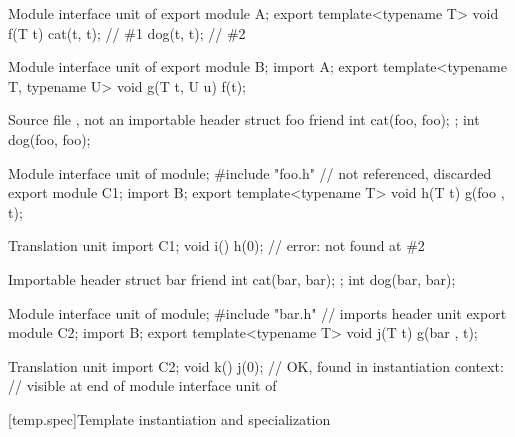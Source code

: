 \pnum
\begin{example}
\begin{codeblocktu}{Module interface unit of }
export module A;
export template<typename T>
void f(T t) {
  cat(t, t);            // \#1
  dog(t, t);            // \#2
}
\end{codeblocktu}

\begin{codeblocktu}{Module interface unit of }
export module B;
import A;
export template<typename T, typename U>
void g(T t, U u) {
  f(t);
}
\end{codeblocktu}

\begin{codeblocktu}{Source file , not an importable header}
struct foo {
  friend int cat(foo, foo);
};
int dog(foo, foo);
\end{codeblocktu}

\begin{codeblocktu}{Module interface unit of }
module;
#include "foo.h"        //  not referenced, discarded
export module C1;
import B;
export template<typename T>
void h(T t) {
  g(foo{ }, t);
}
\end{codeblocktu}

\begin{codeblocktu}{Translation unit}
import C1;
void i() {
   h(0);                // error:  not found at \#2
}
\end{codeblocktu}

\begin{codeblocktu}{Importable header }
struct bar {
  friend int cat(bar, bar);
};
int dog(bar, bar);
\end{codeblocktu}

\begin{codeblocktu}{Module interface unit of }
module;
#include "bar.h"        // imports header unit 
export module C2;
import B;
export template<typename T>
void j(T t) {
  g(bar{ }, t);
}
\end{codeblocktu}

\begin{codeblocktu}{Translation unit}
import C2;
void k() {
   j(0);                // OK,  found in instantiation context:
                        // visible at end of module interface unit of 
}
\end{codeblocktu}
\end{example}

[temp.spec]{Template instantiation and specialization}

